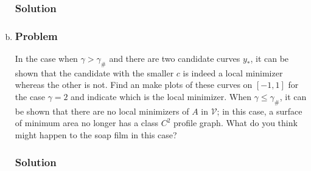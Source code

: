 \documentclass[12pt,twoside]{article}
\begin{document}
\begin{enumerate}[(a)]
\subsubsection*{Solution}
\todo{}

\item
\subsubsection*{Problem}
In the case when $\gamma > \gamma_{\#}$ and there are two candidate curves
$y_*$, it can be shown that the candidate with the smaller $c$ is indeed a local
minimizer whereas the other is not. Find an make plots of these curves on
$[-1,1]$ for the case $\gamma=2$ and indicate which is the local minimizer. When
$\gamma\le\gamma_{\#}$, it can be shown that there are no local minimizers of
$A$ in $\mathcal{V}$; in this case, a surface of minimum area no longer has a
class $C^2$ profile graph. What do you think might happen to the soap film in
this case?

\subsubsection*{Solution}
\todo{}

\end{enumerate}
\end{document}
